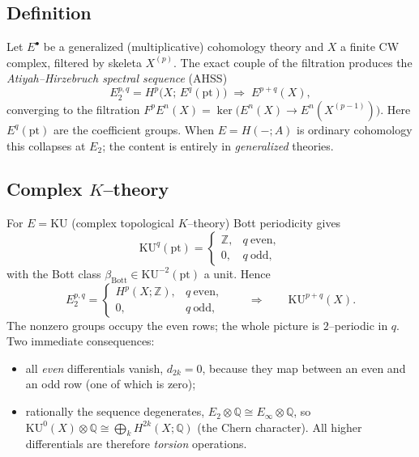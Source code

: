\documentclass{article}
\newcommand{\Q}{{\mathbb{Q}}}
\newcommand{\Z}{{\mathbb{Z}}}
\newcommand{\KU}{\mathrm{KU}}
\newcommand{\ptt}{\mathrm{pt}}
\begin{document}
\subsection{Definition}

Let $E^\bullet$ be a generalized (multiplicative) cohomology theory and $X$ a
finite CW complex, filtered by skeleta $X^{(p)}$. The exact couple of the
filtration produces the \emph{Atiyah--Hirzebruch spectral sequence} (AHSS)
\begin{equation}\label{eq:AHSS}
  E_2^{p,q}=H^p\!\big(X;\,E^q(\ptt)\big)\;\Longrightarrow\; E^{p+q}(X),
\end{equation}
converging to the filtration $F^pE^n(X)=\ker\!\big(E^n(X)\to E^n(X^{(p-1)})\big)$.
Here $E^q(\ptt)$ are the coefficient groups. When $E=H(-;A)$ is ordinary
cohomology this collapses at $E_2$; the content is entirely in \emph{generalized}
theories.

\subsection{Complex $K$--theory}

For $E=\KU$ (complex topological $K$--theory) Bott periodicity gives
\[
  \KU^q(\ptt)=\begin{cases}\Z,& q\ \text{even},\\ 0,& q\ \text{odd},\end{cases}
\]
with the Bott class $\beta_{\mathrm{Bott}}\in\KU^{-2}(\ptt)$ a unit. Hence
\begin{equation}\label{eq:E2K}
  E_2^{p,q}=\begin{cases}H^p(X;\Z),& q\ \text{even},\\ 0,& q\ \text{odd},\end{cases}
  \qquad\Longrightarrow\qquad \KU^{p+q}(X).
\end{equation}
The nonzero groups occupy the even rows; the whole picture is $2$--periodic in
$q$. Two immediate consequences:
\begin{itemize}
\item all \emph{even} differentials vanish, $d_{2k}=0$, because they map between
an even and an odd row (one of which is zero);
\item rationally the sequence degenerates, $E_2\otimes\Q\cong E_\infty\otimes\Q$,
so $\KU^0(X)\otimes\Q\cong\bigoplus_k H^{2k}(X;\Q)$ (the Chern character). All
higher differentials are therefore \emph{torsion} operations.
\end{itemize}

\end{document}
